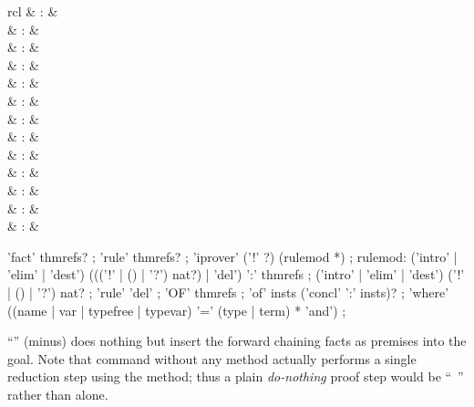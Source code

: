 \begin{isabellebody}
\begin{isamarkuptext}
  \begin{matharray}{rcl}
    \mbox{\isa{{\isacharminus}}} & : & \isarmeth \\
    \mbox{} & : & \isarmeth \\
    \mbox{} & : & \isarmeth \\
    \mbox{} & : & \isarmeth \\
    \mbox{} & : & \isarmeth \\
    \mbox{} & : & \isarmeth \\[0.5ex]
    \mbox{} & : & \isaratt \\
    \mbox{} & : & \isaratt \\
    \mbox{} & : & \isaratt \\
    \mbox{} & : & \isaratt \\[0.5ex]
    \mbox{} & : & \isaratt \\
    \mbox{} & : & \isaratt \\
    \mbox{} & : & \isaratt \\
  \end{matharray}

  \begin{rail}
    'fact' thmrefs?
    ;
    'rule' thmrefs?
    ;
    'iprover' ('!' ?) (rulemod *)
    ;
    rulemod: ('intro' | 'elim' | 'dest') ((('!' | () | '?') nat?) | 'del') ':' thmrefs
    ;
    ('intro' | 'elim' | 'dest') ('!' | () | '?') nat?
    ;
    'rule' 'del'
    ;
    'OF' thmrefs
    ;
    'of' insts ('concl' ':' insts)?
    ;
    'where' ((name | var | typefree | typevar) '=' (type | term) * 'and')
    ;
  \end{rail}

  \begin{descr}
  
  \item [``\mbox{\isa{{\isacharminus}}}'' (minus)] does nothing but insert the
  forward chaining facts as premises into the goal.  Note that command
  \mbox{} without any method actually performs a single
  reduction step using the \mbox{} method; thus a plain
  \emph{do-nothing} proof step would be ``\mbox{}~\isa{{\isachardoublequote}{\isacharminus}{\isachardoublequote}}'' rather than \mbox{} alone.
  

\end{descr}
\end{isamarkuptext}
\end{isabellebody}
